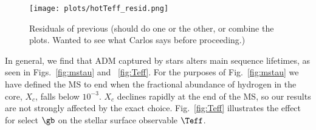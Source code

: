     \begin{figure*}
    \centering
    \texttt{[image: plots/hotTeff\_resid.png]}
    \caption{
    Residuals of previous (should do one or the other, or combine the plots. Wanted to see what Carlos says before proceeding.)
    }
    \label{fig:hotTeff}

  \end{figure*}





  In general, we find that ADM captured by stars alters main sequence lifetimes, as seen in Figs.~\ref{fig:mstau} and ~\ref{fig:Teff}.
  For the purposes of Fig.~\ref{fig:mstau} we have defined the
  MS to end when the fractional abundance of hydrogen in the core, $X_c$, falls below $10^{-3}$. $X_c$ declines rapidly at the end of the MS, so our results are not strongly affected by the exact choice.
  Fig.~\ref{fig:Teff} illustrates the effect for select $\gb$ on the stellar surface observable $\Teff$.

